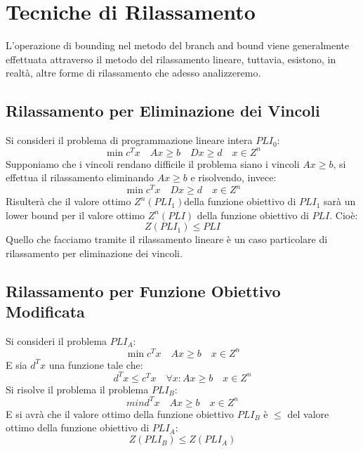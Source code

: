 \section{Tecniche di Rilassamento}
L'operazione di bounding nel metodo del branch and bound viene generalmente effettuata attraverso il metodo del rilassamento lineare, tuttavia, esistono, in realtà, altre forme di rilassamento che adesso analizzeremo.
\subsection{Rilassamento per Eliminazione dei Vincoli}
Si consideri il problema di programmazione lineare intera $PLI_0$:
\[\min c^Tx \quad Ax \geq b \quad D x \geq d \quad x \in Z ^n\]
Supponiamo che i vincoli rendano difficile il problema siano i vincoli $Ax \geq b$, si effettua il rilassamento eliminando $Ax \geq b$ e risolvendo, invece:
\[\min c^Tx \quad Dx \geq d \quad x \in Z^n \] 
Risulterà che il valore ottimo $Z^n(PLI_1)$della funzione obiettivo di $PLI_1$ sarà un lower bound per il valore ottimo $Z^n(PLI)$ della funzione obiettivo di $PLI$. Cioè:
\[Z(PLI_1) \leq PLI\]
Quello che facciamo tramite il rilassamento lineare è un caso particolare di rilassamento per eliminazione dei vincoli.
\subsection{Rilassamento per Funzione Obiettivo Modificata}
Si consideri il problema $PLI_A$:
\[\min c^Tx \quad Ax \geq b \quad x \in Z ^n\]
E sia $d^Tx$ una funzione tale che:
\[d^Tx \leq c^Tx \quad \forall x: Ax \geq b \quad x\in Z^n\]
Si risolve il problema il problema $PLI_B$:
\[min d^Tx \quad Ax \geq b \quad x\in Z^n\]
E si avrà che  il valore ottimo della funzione obiettivo $PLI_B$ è $\leq$ del valore ottimo della funzione obiettivo di $PLI_A$: 
\[Z(PLI_B) \leq Z(PLI_A)\]
